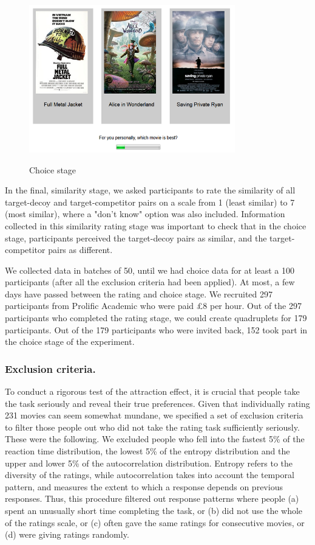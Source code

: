 \documentclass[12pt, a4paper]{article}
\begin{document}
\begin{figure}[htb!]
\centering
\captionsetup{justification=centering}
\caption{Choice stage}
\includegraphics[width=0.8\textwidth]{rsz_exp1_choicestage.png}
\label{fig:exp1_screenshot}
\end{figure}

In the final, similarity stage, we asked participants to rate the similarity of all target-decoy and target-competitor pairs on a scale from 1 (least similar) to 7 (most similar), where a "don't know" option was also included. Information collected in this similarity rating stage was important to check that in the choice stage, participants perceived the target-decoy pairs as similar, and the target-competitor pairs as different.

We collected data in batches of 50, until we had choice data for at least a 100 participants (after all the exclusion criteria had been applied). At most, a few days have passed between the rating and choice stage. We recruited 297 participants from Prolific Academic who were paid £8 per hour. Out of the 297 participants who completed the rating stage, we could create quadruplets for 179 participants. Out of the 179 participants who were invited back, 152 took part in the choice stage of the experiment.

\subsubsection*{Exclusion criteria.} \label{exclusion_ref}

To conduct a rigorous test of the attraction effect, it is crucial that people take the task seriously and reveal their true preferences. Given that individually rating 231 movies can seem somewhat mundane, we specified a set of exclusion criteria to filter those people out who did not take the rating task sufficiently seriously. These were the following. We excluded people who fell into the fastest 5\% of the reaction time distribution, the lowest 5\% of the entropy distribution and the upper and lower 5\% of the autocorrelation distribution. Entropy refers to the diversity of the ratings, while autocorrelation takes into account the temporal pattern, and measures the extent to which a response depends on previous responses. Thus, this procedure filtered out response patterns where people (a) spent an unusually short time completing the task, or (b) did not use the whole of the ratings scale, or (c) often gave the same ratings for consecutive movies, or (d) were giving ratings randomly.
\end{document}
